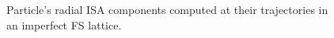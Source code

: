 \begin{figure}[!h]
	\centering
	\hfill
	\hfill
	\caption{Particle's radial ISA components computed at their trajectories
          in an imperfect FS lattice.\label{decoh:fig:NX_on_traj}}
\end{figure}

